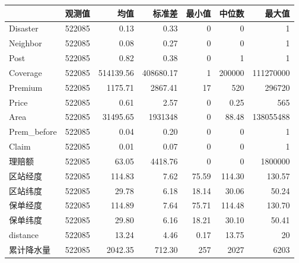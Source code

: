 \begin{tabular}{lrrrrrr}
\toprule
 & 观测值 & 均值 & 标准差 & 最小值 & 中位数 & 最大值 \\
\midrule
Disaster & 522085 & 0.13 & 0.33 & 0 & 0 & 1 \\
Neighbor & 522085 & 0.08 & 0.27 & 0 & 0 & 1 \\
Post & 522085 & 0.82 & 0.38 & 0 & 1 & 1 \\
Coverage & 522085 & 514139.56 & 408680.17 & 1 & 200000 & 111270000 \\
Premium & 522085 & 1175.71 & 2867.41 & 17 & 520 & 296720 \\
Price & 522085 & 0.61 & 2.57 & 0 & 0.25 & 565 \\
Area & 522085 & 31495.65 & 1931348 & 0 & 88.48 & 138055488 \\
Prem\_before & 522085 & 0.04 & 0.20 & 0 & 0 & 1 \\
Claim & 522085 & 0.01 & 0.07 & 0 & 0 & 1 \\
理赔额 & 522085 & 63.05 & 4418.76 & 0 & 0 & 1800000 \\
区站经度 & 522085 & 114.83 & 7.62 & 75.59 & 114.30 & 130.57 \\
区站纬度 & 522085 & 29.78 & 6.18 & 18.14 & 30.06 & 50.24 \\
保单经度 & 522085 & 114.89 & 7.64 & 75.71 & 114.48 & 130.70 \\
保单纬度 & 522085 & 29.80 & 6.16 & 18.21 & 30.10 & 50.41 \\
distance & 522085 & 13.24 & 4.46 & 0.17 & 13.75 & 20 \\
累计降水量 & 522085 & 2042.35 & 712.30 & 257 & 2027 & 6203 \\
\bottomrule
\end{tabular}
